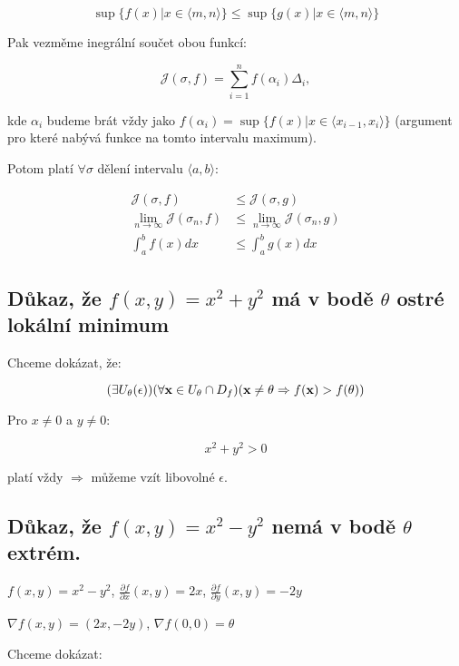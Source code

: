 \[ \sup \{f(x)| x \in \langle m, n \rangle\} \leq \sup \{g(x)| x \in \langle m, n \rangle\}\]

\noindent Pak vezměme inegrální součet obou funkcí:

\[ \mathcal{J}(\sigma,f) = \sum_{i=1}^n f(\alpha_i) \Delta_i, \]

\noindent kde $\alpha_i$ budeme brát vždy jako $f(\alpha_i) = \sup \{f(x)| x \in \langle x_{i-1}, x_{i} \rangle\}$ (argument pro které nabývá funkce na tomto intervalu maximum).

\noindent Potom platí $\forall \sigma$ dělení intervalu $\langle a, b\rangle$:

\begin{align*}
    \mathcal{J}(\sigma, f)                            & \leq \mathcal{J}(\sigma, g)                            \\
    \lim\limits_{n\to\infty} \mathcal{J}(\sigma_n, f) & \leq \lim\limits_{n\to\infty} \mathcal{J}(\sigma_n, g) \\
    \int_a^b f(x)dx                                   & \leq \int_a^b g(x)dx
\end{align*}

\subsection*{Důkaz, že $f(x, y) = x^2 + y^2$ má v bodě $\theta$ ostré lokální minimum}

Chceme dokázat, že:

\[ (\exists U_\theta(\epsilon))(\forall \mathbf{x} \in U_\theta \cap D_f)(\mathbf{x} \ne \theta \Rightarrow f(\mathbf{x}) > f(\theta)) \]

\noindent Pro $x \ne 0$ a $y \ne 0$:

\[ x^2 + y^2 > 0 \]

\noindent platí vždy $\Rightarrow$ můžeme vzít libovolné $\epsilon$.

\subsection*{Důkaz, že $f(x, y) = x^2 - y^2$ nemá v bodě $\theta$ extrém.}

$f(x, y) = x^2 - y^2$, $\frac{\partial f}{\partial x}(x, y) = 2x$, $\frac{\partial f}{\partial y}(x, y) = -2y$

\noindent $\nabla f(x, y) = (2x, -2y)$, $\nabla f(0, 0) = \theta$

\vspace{0.5em}

\noindent Chceme dokázat:

